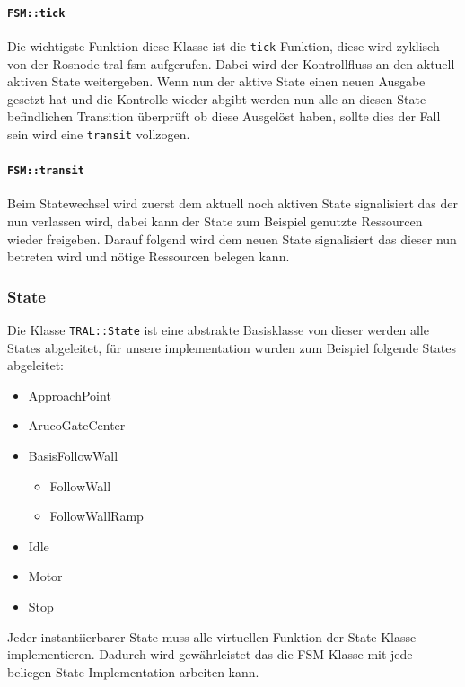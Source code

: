 \paragraph{\texttt{FSM::tick}}

Die wichtigste Funktion diese Klasse ist die \texttt{tick} Funktion, diese wird zyklisch von der Rosnode tral-fsm aufgerufen. Dabei wird der Kontrollfluss an den aktuell aktiven State weitergeben. Wenn nun der aktive State einen neuen Ausgabe gesetzt hat und die Kontrolle wieder abgibt werden nun alle an diesen State befindlichen Transition überprüft ob diese Ausgelöst haben, sollte dies der Fall sein wird eine \texttt{transit} vollzogen.

\paragraph{\texttt{FSM::transit}}

Beim Statewechsel wird zuerst dem aktuell noch aktiven State signalisiert das der nun verlassen wird, dabei kann der State
zum Beispiel genutzte Ressourcen wieder freigeben. Darauf folgend wird dem neuen State signalisiert das dieser nun betreten wird und nötige Ressourcen belegen kann.


\subsubsection{State}
Die Klasse \texttt{TRAL::State} ist eine abstrakte Basisklasse von dieser werden alle States abgeleitet, für unsere implementation wurden zum Beispiel folgende States abgeleitet:

\begin{itemize}
	\item ApproachPoint
	\item ArucoGateCenter
	\item BasisFollowWall
	\begin{itemize}
		\item FollowWall
		\item FollowWallRamp
	\end{itemize}
	\item Idle
	\item Motor
	\item Stop
\end{itemize}

Jeder instantiierbarer State muss alle virtuellen Funktion der State Klasse implementieren. Dadurch wird gewährleistet das die FSM Klasse mit jede beliegen State Implementation arbeiten kann.


